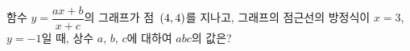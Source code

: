 함수 $y=\dfrac{ax+b}{x+c}$의 그래프가 점~$(4{,}\mkern3mu\mathopen{}4)$를 지나고, 그래프의 점근선의 방정식이 $x=3$, $y=-1$일 때, 상수 $a$, $b$, $c$에 대하여 $abc$의 값은?
